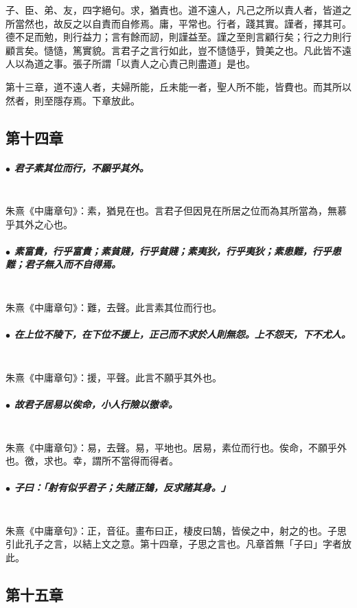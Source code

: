 \documentclass[hyperref, UTF8, 12pt, a4paper]{ctexrep}
\begin{document}
\begin{adjustwidth}{2cm}{1cm}
\indent\indent 子、臣、弟、友，四字絕句。求，猶責也。道不遠人，凡己之所以責人者，皆道之所當然也，故反之以自責而自修焉。庸，平常也。行者，踐其實。謹者，擇其可。德不足而勉，則行益力；言有餘而訒，則謹益至。謹之至則言顧行矣；行之力則行顧言矣。慥慥，篤實貌。言君子之言行如此，豈不慥慥乎，贊美之也。凡此皆不遠人以為道之事。張子所謂「以責人之心責己則盡道」是也。

第十三章，道不遠人者，夫婦所能，丘未能一者，聖人所不能，皆費也。而其所以然者，則至隱存焉。下章放此。
\end{adjustwidth}

\newpage
\subsection{第十四章}

\subparagraph{$\bullet$ 君子素其位而行，不願乎其外。} ~\\

朱熹《中庸章句》：素，猶見在也。言君子但因見在所居之位而為其所當為，無慕乎其外之心也。

\subparagraph{$\bullet$ 素富貴，行乎富貴；素貧賤，行乎貧賤；素夷狄，行乎夷狄；素患難，行乎患難；君子無入而不自得焉。} ~\\

朱熹《中庸章句》：難，去聲。此言素其位而行也。

\subparagraph{$\bullet$ 在上位不陵下，在下位不援上，正己而不求於人則無怨。上不怨天，下不尤人。} ~\\

朱熹《中庸章句》：援，平聲。此言不願乎其外也。

\subparagraph{$\bullet$ 故君子居易以俟命，小人行險以徼幸。} ~\\

朱熹《中庸章句》：易，去聲。易，平地也。居易，素位而行也。俟命，不願乎外也。徼，求也。幸，謂所不當得而得者。

\subparagraph{$\bullet$ 子曰：「射有似乎君子；失諸正鵠，反求諸其身。」} ~\\

朱熹《中庸章句》：正，音征。畫布曰正，棲皮曰鵠，皆侯之中，射之的也。子思引此孔子之言，以結上文之意。第十四章，子思之言也。凡章首無「子曰」字者放此。

\newpage
\subsection{第十五章}
\end{document}
